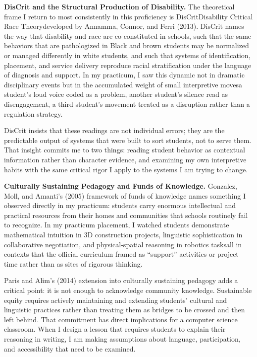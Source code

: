 \documentclass[12pt]{article}
\begin{document}
\newpage

\textbf{DisCrit and the Structural Production of Disability.}
The theoretical frame I return to most consistently in this proficiency is DisCrit\textemdash{}Disability Critical Race Theory\textemdash{}developed by Annamma, Connor, and Ferri (2013). DisCrit names the way that disability and race are co-constituted in schools, such that the same behaviors that are pathologized in Black and brown students may be normalized or managed differently in white students, and such that systems of identification, placement, and service delivery reproduce racial stratification under the language of diagnosis and support. In my practicum, I saw this dynamic not in dramatic disciplinary events but in the accumulated weight of small interpretive moves\textemdash{}a student's loud voice coded as a problem, another student's silence read as disengagement, a third student's movement treated as a disruption rather than a regulation strategy.

DisCrit insists that these readings are not individual errors; they are the predictable output of systems that were built to sort students, not to serve them. That insight commits me to two things: reading student behavior as contextual information rather than character evidence, and examining my own interpretive habits with the same critical rigor I apply to the systems I am trying to change.

\textbf{Culturally Sustaining Pedagogy and Funds of Knowledge.}
Gonzalez, Moll, and Amanti's (2005) framework of funds of knowledge names something I observed directly in my practicum: students carry enormous intellectual and practical resources from their homes and communities that schools routinely fail to recognize. In my practicum placement, I watched students demonstrate mathematical intuition in 3D construction projects, linguistic sophistication in collaborative negotiation, and physical-spatial reasoning in robotics tasks\textemdash{}all in contexts that the official curriculum framed as ``support'' activities or project time rather than as sites of rigorous thinking.

Paris and Alim's (2014) extension into culturally sustaining pedagogy adds a critical point: it is not enough to acknowledge community knowledge. Sustainable equity requires actively maintaining and extending students' cultural and linguistic practices rather than treating them as bridges to be crossed and then left behind. That commitment has direct implications for a computer science classroom. When I design a lesson that requires students to explain their reasoning in writing, I am making assumptions about language, participation, and accessibility that need to be examined.
\end{document}

